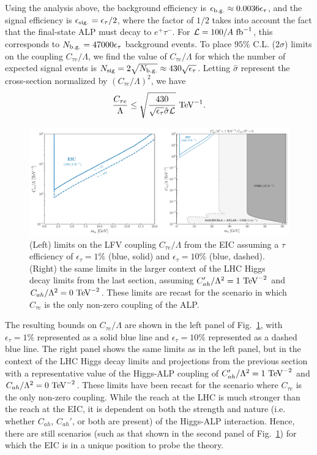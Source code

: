 Using the analysis above, the background efficiency is $\epsilon_{\rm b.g.} \approx 0.0036\epsilon_\tau$, and the signal efficiency is $\epsilon_{\rm sig.} = \epsilon_\tau/2$, where the factor of $1/2$ takes into account the fact that the final-state ALP must decay to $e^+\tau^-$. For ${\cal L} = 100/A~{\rm fb}^{-1}$, this corresponds to $N_{\rm b.g.} = 47000\epsilon_\tau$ background events. To place $95\%$ C.L. ($2\sigma$) limits on the coupling $C_{\tau e}/\Lambda$, we find the value of $C_{\tau e}/\Lambda$ for which the number of expected signal events is $N_{\rm sig} = 2\sqrt{N_{\rm b.g.}} \approx 430\sqrt{\epsilon_\tau}$. Letting $\hat{\sigma}$ represent the cross-section normalized by $(C_{\tau e}/\Lambda)^2$, we have
\begin{align}
    \frac{C_{\tau e}}{\Lambda} \leq \sqrt{\frac{430}{\sqrt{\epsilon_\tau}\hat{\sigma} {\cal L}}}~{\rm TeV}^{-1}.
\end{align}
\begin{figure}[t!]
    \centering
    \includegraphics[width=\linewidth]{figures/chapter5/EIC_ALP_limits.pdf}
    \caption[Projected constraints on LFV ALPs at the EIC.]{(Left) limits on the LFV coupling $C_{\tau e}/\Lambda$ from the EIC assuming a $\tau$ efficiency of $\epsilon_\tau = 1\%$ (blue, solid) and $\epsilon_\tau = 10\%$ (blue, dashed). (Right) the same limits in the larger context of the LHC Higgs decay limits from the last section, assuming $C_{ah}'/\Lambda^2 = 1~{\rm TeV}^{-2}$ and $C_{ah}/\Lambda^2 = 0~{\rm TeV}^{-2}$. These limits are recast for the scenario in which $C_{\tau e}$ is the only non-zero coupling of the ALP.}
    \label{fig:EIC_ALP_limits}
\end{figure}

The resulting bounds on $C_{\tau e}/\Lambda$ are shown in the left panel of Fig.~\ref{fig:EIC_ALP_limits}, with $\epsilon_\tau = 1\%$ represented as a solid blue line and $\epsilon_\tau = 10\%$ represented as a dashed blue line. The right panel shows the same limits as in the left panel, but in the context of the LHC Higgs decay limits and projections from the previous section with a representative value of the Higgs-ALP coupling of $C_{ah}'/\Lambda^2 = 1~{\rm TeV}^{-2}$ and $C_{ah}/\Lambda^2 = 0~{\rm TeV}^{-2}$. These limits have been recast for the scenario where $C_{\tau e}$ is the only non-zero coupling. While the reach at the LHC is much stronger than the reach at the EIC, it is dependent on both the strength and nature (i.e. whether $C_{ah}$, $C_{ah}'$, or both are present) of the Higgs-ALP interaction. Hence, there are still scenarios (such as that shown in the second panel of Fig.~\ref{fig:EIC_ALP_limits}) for which the EIC is in a unique position to probe the theory.

